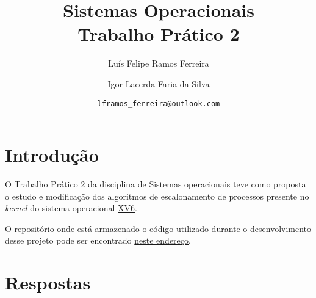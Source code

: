 \documentclass{article}
\title{Sistemas Operacionais \\ \large Trabalho Prático 2}
\author{Luís Felipe Ramos Ferreira \and Igor Lacerda Faria da Silva}
\date{\href{mailto:lframos\_ferreira@outlook.com}{\texttt{lframos\_ferreira@outlook.com}}}
\begin{document}
\maketitle

\section{Introdução}

O Trabalho Prático 2 da disciplina de Sistemas operacionais teve como proposta
o estudo e modificação dos algoritmos de escalonamento de processos presente
no \textit{kernel} do sistema operacional \href{https://github.com/mit-pdos/xv6-public}{XV6}.

O repositório onde está armazenado o código utilizado durante o desenvolvimento
desse projeto
pode ser encontrado \href{https://github.com/lframosferreira/tp2-so}{neste
      endereço}.

\section{Respostas}
\end{document}
